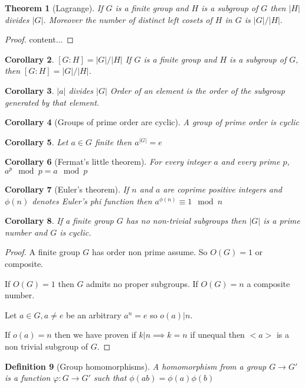 \documentclass[oneside,11pt,pdftex]{book}%
\numberwithin{equation}{section}
\newtheorem{theorem}{Theorem}[chapter]%
\newtheorem{corollary}[theorem]{Corollary}
\newtheorem{definition}[theorem]{Definition}
\numberwithin{section}{chapter}
\numberwithin{equation}{chapter}
\begin{document}
\begin{theorem}[Lagrange]
	If $ G $ is a finite group and $ H$ is a subgroup of $ G $ then $ |H| $ divides $ |G| $. Moreover the number of distinct left cosets of $ H $ in $ G $ is $ |G|/|H|. $
\end{theorem}
\begin{proof}
	content...
\end{proof}


\begin{corollary}{$ [G:H]=|G|/|H| $}
	If $ G $ is a finite group and $ H $ is a subgroup of $ G, $ then $ [G:H]=|G|/|H| $.
\end{corollary}

\begin{corollary}{$ |a| $ divides $ |G| $}
	Order of an element is the order of the subgroup generated by that element.
\end{corollary}

\begin{corollary}[Groups of prime order are cyclic]
	A group of prime order is cyclic
\end{corollary}

\begin{corollary}
	Let $ a \in G$ finite then $ a^{|G|}=e $
\end{corollary}

\begin{corollary}[Fermat's little theorem]
	For every integer $ a $ and every prime $ p $, $ a^p \mod p = a \mod p $
\end{corollary}

\begin{corollary}[Euler's theorem]
	If $ n $ and $ a $ are coprime positive integers and $ \phi(n) $ denotes Euler's phi function then $ a^{\phi(n)} \equiv 1 \mod n$
\end{corollary}

\begin{corollary}
	If a finite group $ G $ has no non-trivial subgroups then $ |G| $ is a prime number and $ G $ is cyclic.
\end{corollary}
\begin{proof}
	A finite group $ G $ has order non prime assume. So $ O(G) =1$ or composite.
	
	If $ O(G)=1 $ then $ G $ admits no proper subgroups. If $ O(G)=n $ a composite number.
	
	Let $ a\in G, a\neq e $ be an arbitrary $ a^n=e $ so $ o(a) | n$.
	
	If $ o(a)=n $ then we have proven if $ k|n \implies k=n $ if unequal then $ <a>  $ is a non trivial subgroup of $ G $.
\end{proof}

\begin{definition}[Group homomorphisms]
	A homomorphism from a group $ G \rightarrow G' $ is a function $ \varphi : G \rightarrow G' $ such that $ \phi(ab) = \phi(a)\phi(b)$
\end{definition}

\backmatter



\thispagestyle{empty}%
{\ }
\newpage
\end{document}
